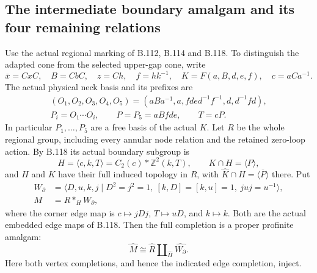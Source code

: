 \subsection*{The intermediate boundary amalgam and its four remaining relations}

\label{stmt:B120}
Use the actual regional marking of B.112, B.114 and B.118. To
distinguish the adapted cone from the selected upper-gap cone, write
\[
 \bar x=CxC,\quad B=CbC,\quad z=Ch,\quad f=hk^{-1},\quad
 K=F(a,B,d,e,f),\quad c=aCa^{-1}.
\]
The actual physical neck basis and its prefixes are
\begin{equation}\label{eq:B120-prefixes}
 \begin{gathered}
 (O_1,O_2,O_3,O_4,O_5)
   =(aBa^{-1},a,fde d^{-1}f^{-1},d,d^{-1}fd),\\
 P_i=O_1\cdots O_i,\qquad P=P_5=aBfde,\qquad T=cP.
 \end{gathered}
\end{equation}
In particular $P_1,\ldots,P_5$ are a free basis of the actual $K$.
Let $R$ be the whole regional group, including every annular node
relation and the retained zero-loop action. By B.118 its actual
boundary subgroup is
\[
 H=\langle c,k,T\rangle=C_2(c)*\mathbb Z^2(k,T),\qquad
 K\cap H=\langle P\rangle,
\]
and $H$ and $K$ have their full induced topology in $R$, with
$\widehat K\cap\widehat H=\overline{\langle P\rangle}$ there.
Put
\begin{equation}\label{eq:B120-corner-amalgam}
 \begin{split}
 W_{\partial}&=\langle D,u,k,j\mid D^2=j^2=1,
              \ [k,D]=[k,u]=1,\ juj=u^{-1}\rangle,\\
 M&=R*_{H}W_{\partial},
 \end{split}
\end{equation}
where the corner edge map is $c\mapsto jDj$, $T\mapsto uD$,
and $k\mapsto k$. Both are the actual embedded edge maps of
B.118. Then the full completion is a proper profinite amalgam:
\begin{equation}\label{eq:B120-full-completion}
 \widehat M\cong
       \widehat R\amalg_{\widehat H}\widehat{W_{\partial}}.
\end{equation}
Here both vertex completions, and hence the indicated edge
completion, inject.

